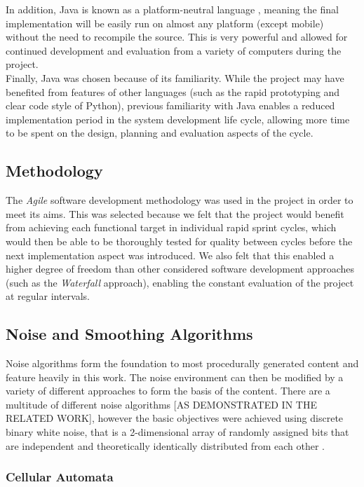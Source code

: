 \documentclass[12pt,a4paper]{article}
\begin{document}
In addition, Java is known as a platform-neutral language \cite{java}, meaning the final implementation will be easily run on almost any platform (except mobile) without the need to recompile the source. This is very powerful and allowed for continued development and evaluation from a variety of computers during the project. \\

Finally, Java was chosen because of its familiarity. While the project may have benefited from features of other languages (such as the rapid prototyping and clear code style of Python), previous familiarity with Java enables a reduced implementation period in the system development life cycle, allowing more time to be spent on the design, planning and evaluation aspects of the cycle. 
\\

\subsection{Methodology}

The \emph{Agile} software development methodology was used in the project in order to meet its aims. This was selected because we felt that the project would benefit from achieving each functional target in individual rapid sprint cycles, which would then be able to be thoroughly tested for quality between cycles before the next implementation aspect was introduced. We also felt that this enabled a higher degree of freedom than other considered software development approaches (such as the \emph{Waterfall} approach), enabling the constant evaluation of the project at regular intervals.

\subsection{Noise and Smoothing Algorithms}

Noise algorithms form the foundation to most procedurally generated content and feature heavily in this work. The noise environment can then be modified by a variety of different approaches to form the basis of the content. There are a multitude of different noise algorithms [AS DEMONSTRATED IN THE RELATED WORK], however the basic objectives were achieved using discrete binary white noise, that is a 2-dimensional array of randomly assigned bits that are independent and theoretically identically distributed from each other \cite{stats}. 

\subsubsection{Cellular Automata}
\end{document}
